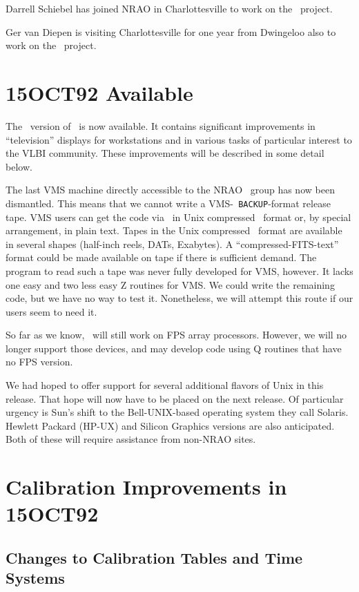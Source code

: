 Darrell Schiebel has joined NRAO in Charlottesville to work on the
\AIPTOO\ project.

Ger van Diepen is visiting Charlottesville for one year from Dwingeloo
also to work on the \AIPTOO\ project.

\section{15OCT92 Available}

The \RELEASENAME\ version of \AIPS\ is now available.  It contains
significant improvements in ``television'' displays for workstations
and in various tasks of particular interest to the VLBI community.
These improvements will be described in some detail below.

The last VMS machine directly accessible to the NRAO \AIPS\ group has
now been dismantled.  This means that we cannot write a VMS-{\tt
BACKUP}-format release tape.  VMS users can get the code via \ftp\ in
Unix compressed \tar\ format or, by special arrangement, in plain text.
Tapes in the Unix compressed \tar\ format are available in several
shapes (half-inch reels, DATs, Exabytes).  A ``compressed-FITS-text''
format could be made available on tape if there is sufficient demand.
The program to read such a tape was never fully developed for VMS,
however.  It lacks one easy and two less easy Z routines for VMS.  We
could write the remaining code, but we have no way to test it.
Nonetheless, we will attempt this route if our users seem to need it.

So far as we know, \AIPS\ will still work on FPS array processors.
However, we will no longer support those devices, and may develop code
using Q routines that have no FPS version.

We had hoped to offer support for several additional flavors of Unix
in this release.  That hope will now have to be placed on the next
release.  Of particular urgency is Sun's shift to the Bell-UNIX-based
operating system they call Solaris.  Hewlett Packard (HP-UX) and
Silicon Graphics versions are also anticipated.  Both of these will
require assistance from non-NRAO sites.

\clearpage

\section{Calibration Improvements in 15OCT92}

\subsection{Changes to Calibration Tables and Time Systems}

